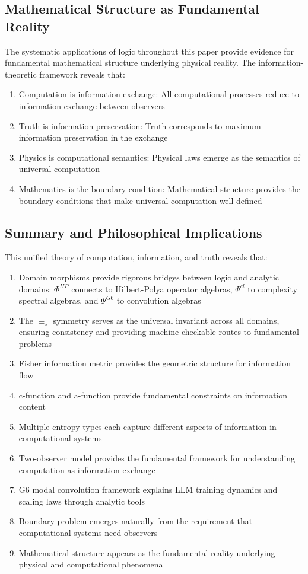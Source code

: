 \begin{theorem}
\subsection{Mathematical Structure as Fundamental Reality}

The systematic applications of logic throughout this paper provide evidence for fundamental mathematical structure underlying physical reality. The information-theoretic framework reveals that:

\begin{enumerate}
\item Computation is information exchange: All computational processes reduce to information exchange between observers
\item Truth is information preservation: Truth corresponds to maximum information preservation in the exchange
\item Physics is computational semantics: Physical laws emerge as the semantics of universal computation
\item Mathematics is the boundary condition: Mathematical structure provides the boundary conditions that make universal computation well-defined
\end{enumerate}

\subsection{Summary and Philosophical Implications}

This unified theory of computation, information, and truth reveals that:

\begin{enumerate}
\item Domain morphisms provide rigorous bridges between logic and analytic domains: $\Phi^{HP}$ connects to Hilbert-Polya operator algebras, $\Psi^{cl}$ to complexity spectral algebras, and $\Psi^{G6}$ to convolution algebras
\item The $\equiv_\star$ symmetry serves as the universal invariant across all domains, ensuring consistency and providing machine-checkable routes to fundamental problems
\item Fisher information metric provides the geometric structure for information flow
\item c-function and a-function provide fundamental constraints on information content
\item Multiple entropy types each capture different aspects of information in computational systems
\item Two-observer model provides the fundamental framework for understanding computation as information exchange
\item G6 modal convolution framework explains LLM training dynamics and scaling laws through analytic tools
\item Boundary problem emerges naturally from the requirement that computational systems need observers
\item Mathematical structure appears as the fundamental reality underlying physical and computational phenomena
\end{enumerate}


\end{theorem}
